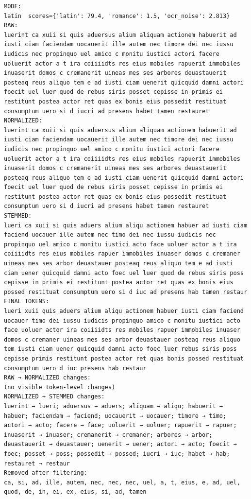 \begin{lstlisting}[breaklines=true,basicstyle=\ttfamily\small]
MODE:
latin  scores={'latin': 79.4, 'romance': 1.5, 'ocr_noise': 2.813}
RAW:
luerint ca xuii si quis aduersus alium aliquam actionem habuerit ad iusti ciam faciendam uocauerit ille autem nec timore dei nec iussu iudicis nec propinquo uel amico c monitu iustici actori facere uoluerit actor a t ira coiiiidts res eius mobiles rapuerit immobiles inuaserit domos c cremanerit uineas mes ses arbores deuastauerit posteaq reus aliquo tem e ad iusti ciam uenerit quicquid damni actori foecit uel luer quod de rebus siris posset cepisse in primis ei restitunt postea actor ret quas ex bonis eius possedit restituat consumptum uero si d iucri ad presens habet tamen restauret
NORMALIZED:
luerint ca xuii si quis aduersus alium aliquam actionem habuerit ad iusti ciam faciendam uocauerit ille autem nec timore dei nec iussu iudicis nec propinquo uel amico c monitu iustici actori facere uoluerit actor a t ira coiiiidts res eius mobiles rapuerit immobiles inuaserit domos c cremanerit uineas mes ses arbores deuastauerit posteaq reus aliquo tem e ad iusti ciam uenerit quicquid damni actori foecit uel luer quod de rebus siris posset cepisse in primis ei restitunt postea actor ret quas ex bonis eius possedit restituat consumptum uero si d iucri ad presens habet tamen restauret
STEMMED:
lueri ca xuii si quis aduers alium aliqu actionem habuer ad iusti ciam faciend uocauer ille autem nec timo dei nec iussu iudicis nec propinquo uel amico c monitu iustici acto face uoluer actor a t ira coiiiidts res eius mobiles rapuer immobiles inuaser domos c cremaner uineas mes ses arbor deuastauer posteaq reus aliquo tem e ad iusti ciam uener quicquid damni acto foec uel luer quod de rebus siris poss cepisse in primis ei restitunt postea actor ret quas ex bonis eius possed restituat consumptum uero si d iuc ad presens hab tamen restaur
FINAL TOKENS:
lueri xuii quis aduers alium aliqu actionem habuer iusti ciam faciend uocauer timo dei iussu iudicis propinquo amico c monitu iustici acto face uoluer actor ira coiiiidts res mobiles rapuer immobiles inuaser domos c cremaner uineas mes ses arbor deuastauer posteaq reus aliquo tem iusti ciam uener quicquid damni acto foec luer rebus siris poss cepisse primis restitunt postea actor ret quas bonis possed restituat consumptum uero d iuc presens hab restaur
RAW → NORMALIZED changes:
(no visible token-level changes)
NORMALIZED → STEMMED changes:
luerint → lueri; aduersus → aduers; aliquam → aliqu; habuerit → habuer; faciendam → faciend; uocauerit → uocauer; timore → timo; actori → acto; facere → face; uoluerit → uoluer; rapuerit → rapuer; inuaserit → inuaser; cremanerit → cremaner; arbores → arbor; deuastauerit → deuastauer; uenerit → uener; actori → acto; foecit → foec; posset → poss; possedit → possed; iucri → iuc; habet → hab; restauret → restaur
Removed after filtering:
ca, si, ad, ille, autem, nec, nec, nec, uel, a, t, eius, e, ad, uel, quod, de, in, ei, ex, eius, si, ad, tamen
\end{lstlisting}

